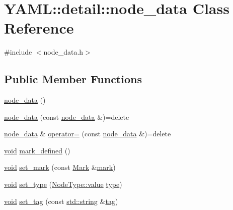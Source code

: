 \hypertarget{class_y_a_m_l_1_1detail_1_1node__data}{}\section{Y\+A\+ML\+::detail\+::node\+\_\+data Class Reference}
\label{class_y_a_m_l_1_1detail_1_1node__data}


{\ttfamily \#include $<$node\+\_\+data.\+h$>$}

\subsection*{Public Member Functions}
\begin{DoxyCompactItemize}
\item 
\mbox{\hyperlink{class_y_a_m_l_1_1detail_1_1node__data_aba27100ebb9091c8353ee416666f4c24}{node\+\_\+data}} ()
\item 
\mbox{\hyperlink{class_y_a_m_l_1_1detail_1_1node__data_af9ab3a2a658e644c2f0bda170082416a}{node\+\_\+data}} (const \mbox{\hyperlink{class_y_a_m_l_1_1detail_1_1node__data}{node\+\_\+data}} \&)=delete
\item 
\mbox{\hyperlink{class_y_a_m_l_1_1detail_1_1node__data}{node\+\_\+data}} \& \mbox{\hyperlink{class_y_a_m_l_1_1detail_1_1node__data_a7146772c06963d618f57a2c5653cd915}{operator=}} (const \mbox{\hyperlink{class_y_a_m_l_1_1detail_1_1node__data}{node\+\_\+data}} \&)=delete
\item 
\mbox{\hyperlink{glad_8h_a950fc91edb4504f62f1c577bf4727c29}{void}} \mbox{\hyperlink{class_y_a_m_l_1_1detail_1_1node__data_ad221be844f0c11bac6c5c3896db05181}{mark\+\_\+defined}} ()
\item 
\mbox{\hyperlink{glad_8h_a950fc91edb4504f62f1c577bf4727c29}{void}} \mbox{\hyperlink{class_y_a_m_l_1_1detail_1_1node__data_a85509514e2fb3cab1e55a6e1fead816f}{set\+\_\+mark}} (const \mbox{\hyperlink{struct_y_a_m_l_1_1_mark}{Mark}} \&\mbox{\hyperlink{class_y_a_m_l_1_1detail_1_1node__data_a346a2ad0e695d513614814d9a67c8536}{mark}})
\item 
\mbox{\hyperlink{glad_8h_a950fc91edb4504f62f1c577bf4727c29}{void}} \mbox{\hyperlink{class_y_a_m_l_1_1detail_1_1node__data_a5d95af82af117629f60af392cc6bcab2}{set\+\_\+type}} (\mbox{\hyperlink{struct_y_a_m_l_1_1_node_type_af83cf3f3c2eca0bf0eae1bbf981e86c4}{Node\+Type\+::value}} \mbox{\hyperlink{glad_8h_a890efa53b3d7deeeced6f3a0d6653ed3}{type}})
\item 
\mbox{\hyperlink{glad_8h_a950fc91edb4504f62f1c577bf4727c29}{void}} \mbox{\hyperlink{class_y_a_m_l_1_1detail_1_1node__data_ac9e581dc9fb4bedde979bddf3bf1830a}{set\+\_\+tag}} (const \mbox{\hyperlink{glad_8h_ac83513893df92266f79a515488701770}{std\+::string}} \&\mbox{\hyperlink{class_y_a_m_l_1_1detail_1_1node__data_ab8b57b9cb59edf5b8669f93a2315fccc}{tag}})

\end{DoxyCompactItemize}
